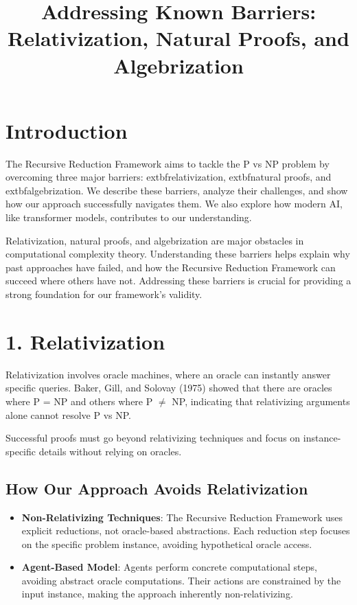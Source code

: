 \documentclass{article}
\title{Addressing Known Barriers: Relativization, Natural Proofs, and Algebrization}
\author{}
\date{}
\begin{document}
\maketitle

\section*{Introduction}
The Recursive Reduction Framework aims to tackle the P vs NP problem by overcoming three major barriers: 	extbf{relativization}, 	extbf{natural proofs}, and 	extbf{algebrization}. We describe these barriers, analyze their challenges, and show how our approach successfully navigates them. We also explore how modern AI, like transformer models, contributes to our understanding.

Relativization, natural proofs, and algebrization are major obstacles in computational complexity theory. Understanding these barriers helps explain why past approaches have failed, and how the Recursive Reduction Framework can succeed where others have not. Addressing these barriers is crucial for providing a strong foundation for our framework's validity.

\section*{1. Relativization}
Relativization involves oracle machines, where an oracle can instantly answer specific queries. Baker, Gill, and Solovay (1975) showed that there are oracles where P = NP and others where P $\neq$ NP, indicating that relativizing arguments alone cannot resolve P vs NP.

Successful proofs must go beyond relativizing techniques and focus on instance-specific details without relying on oracles.

\subsection*{How Our Approach Avoids Relativization}
\begin{itemize}
    \item \textbf{Non-Relativizing Techniques}: The Recursive Reduction Framework uses explicit reductions, not oracle-based abstractions. Each reduction step focuses on the specific problem instance, avoiding hypothetical oracle access.
    \item \textbf{Agent-Based Model}: Agents perform concrete computational steps, avoiding abstract oracle computations. Their actions are constrained by the input instance, making the approach inherently non-relativizing.
\end{itemize}
\end{document}
